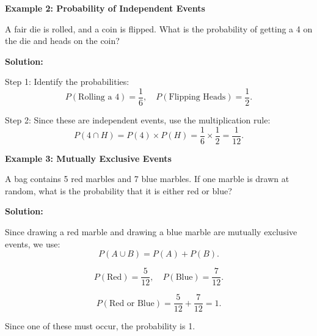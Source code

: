\begin{flushleft}
	\textbf{Example 2: Probability of Independent Events}
	
	A fair die is rolled, and a coin is flipped. What is the probability of getting a 4 on the die and heads on the coin?
	
	\textbf{Solution:}
	
	Step 1: Identify the probabilities:
	\[
	P(\text{Rolling a 4}) = \frac{1}{6}, \quad P(\text{Flipping Heads}) = \frac{1}{2}.
	\]
	
	Step 2: Since these are independent events, use the multiplication rule:
	\[
	P(4 \cap H) = P(4) \times P(H) = \frac{1}{6} \times \frac{1}{2} = \frac{1}{12}.
	\]
\end{flushleft}

\begin{flushleft}
	\textbf{Example 3: Mutually Exclusive Events}
	
	A bag contains 5 red marbles and 7 blue marbles. If one marble is drawn at random, what is the probability that it is either red or blue?
	
	\textbf{Solution:}
	
	Since drawing a red marble and drawing a blue marble are mutually exclusive events, we use:
	\[
	P(A \cup B) = P(A) + P(B).
	\]
	
	\[
	P(\text{Red}) = \frac{5}{12}, \quad P(\text{Blue}) = \frac{7}{12}.
	\]
	
	\[
	P(\text{Red or Blue}) = \frac{5}{12} + \frac{7}{12} = 1.
	\]
	
	Since one of these must occur, the probability is 1.
\end{flushleft}

